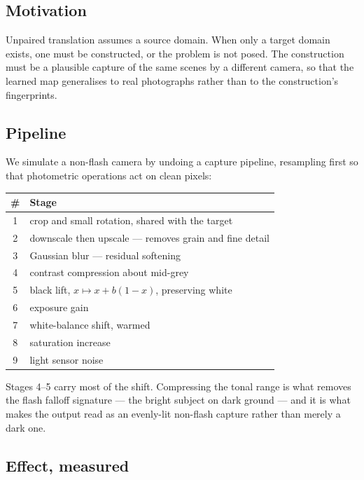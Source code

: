 \documentclass[11pt,a4paper]{article}
\begin{document}
\subsection{Motivation}

Unpaired translation assumes a source domain. When only a target domain exists,
one must be constructed, or the problem is not posed. The construction must be a
plausible capture of the same scenes by a different camera, so that the learned
map generalises to real photographs rather than to the construction's
fingerprints.

\subsection{Pipeline}

We simulate a non-flash camera by undoing a capture pipeline, resampling first so
that photometric operations act on clean pixels:

\begin{center}
\begin{tabular}{@{}cl@{}}
\toprule
\# & Stage \\
\midrule
1 & crop and small rotation, shared with the target \\
2 & downscale then upscale --- removes grain and fine detail \\
3 & Gaussian blur --- residual softening \\
4 & contrast compression about mid-grey \\
5 & black lift, $x \mapsto x + b(1-x)$, preserving white \\
6 & exposure gain \\
7 & white-balance shift, warmed \\
8 & saturation increase \\
9 & light sensor noise \\
\bottomrule
\end{tabular}
\end{center}

Stages 4--5 carry most of the shift. Compressing the tonal range is what removes
the flash falloff signature --- the bright subject on dark ground --- and it is
what makes the output read as an evenly-lit non-flash capture rather than merely
a dark one.

\subsection{Effect, measured}
\end{document}

